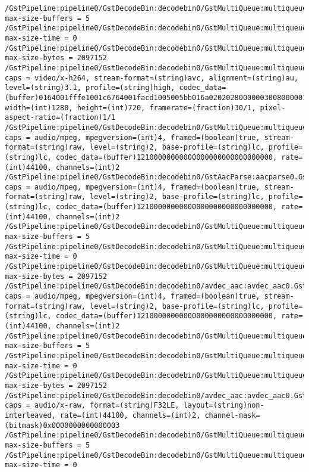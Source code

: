 \documentclass[12pt,oneside]{book}
\begin{document}
\begin{lstlisting}
/GstPipeline:pipeline0/GstDecodeBin:decodebin0/GstMultiQueue:multiqueue0: max-size-buffers = 5
/GstPipeline:pipeline0/GstDecodeBin:decodebin0/GstMultiQueue:multiqueue0: max-size-time = 0
/GstPipeline:pipeline0/GstDecodeBin:decodebin0/GstMultiQueue:multiqueue0: max-size-bytes = 2097152
/GstPipeline:pipeline0/GstDecodeBin:decodebin0/GstMultiQueue:multiqueue0.GstMultiQueuePad:sink_0: caps = video/x-h264, stream-format=(string)avc, alignment=(string)au, level=(string)3.1, profile=(string)high, codec_data=(buffer)0164001fffe1001c6764001facd1005005bb016a02020280000003008000001e078c188901000468eb8f2c, width=(int)1280, height=(int)720, framerate=(fraction)30/1, pixel-aspect-ratio=(fraction)1/1
/GstPipeline:pipeline0/GstDecodeBin:decodebin0/GstMultiQueue:multiqueue0.GstMultiQueuePad:sink_1: caps = audio/mpeg, mpegversion=(int)4, framed=(boolean)true, stream-format=(string)raw, level=(string)2, base-profile=(string)lc, profile=(string)lc, codec_data=(buffer)12100000000000000000000000000000, rate=(int)44100, channels=(int)2
/GstPipeline:pipeline0/GstDecodeBin:decodebin0/GstAacParse:aacparse0.GstPad:src: caps = audio/mpeg, mpegversion=(int)4, framed=(boolean)true, stream-format=(string)raw, level=(string)2, base-profile=(string)lc, profile=(string)lc, codec_data=(buffer)12100000000000000000000000000000, rate=(int)44100, channels=(int)2
/GstPipeline:pipeline0/GstDecodeBin:decodebin0/GstMultiQueue:multiqueue0: max-size-buffers = 5
/GstPipeline:pipeline0/GstDecodeBin:decodebin0/GstMultiQueue:multiqueue0: max-size-time = 0
/GstPipeline:pipeline0/GstDecodeBin:decodebin0/GstMultiQueue:multiqueue0: max-size-bytes = 2097152
/GstPipeline:pipeline0/GstDecodeBin:decodebin0/avdec_aac:avdec_aac0.GstPad:sink: caps = audio/mpeg, mpegversion=(int)4, framed=(boolean)true, stream-format=(string)raw, level=(string)2, base-profile=(string)lc, profile=(string)lc, codec_data=(buffer)12100000000000000000000000000000, rate=(int)44100, channels=(int)2
/GstPipeline:pipeline0/GstDecodeBin:decodebin0/GstMultiQueue:multiqueue0: max-size-buffers = 5
/GstPipeline:pipeline0/GstDecodeBin:decodebin0/GstMultiQueue:multiqueue0: max-size-time = 0
/GstPipeline:pipeline0/GstDecodeBin:decodebin0/GstMultiQueue:multiqueue0: max-size-bytes = 2097152
/GstPipeline:pipeline0/GstDecodeBin:decodebin0/avdec_aac:avdec_aac0.GstPad:src: caps = audio/x-raw, format=(string)F32LE, layout=(string)non-interleaved, rate=(int)44100, channels=(int)2, channel-mask=(bitmask)0x0000000000000003
/GstPipeline:pipeline0/GstDecodeBin:decodebin0/GstMultiQueue:multiqueue0: max-size-buffers = 5
/GstPipeline:pipeline0/GstDecodeBin:decodebin0/GstMultiQueue:multiqueue0: max-size-time = 0

\end{lstlisting}
\end{document}
